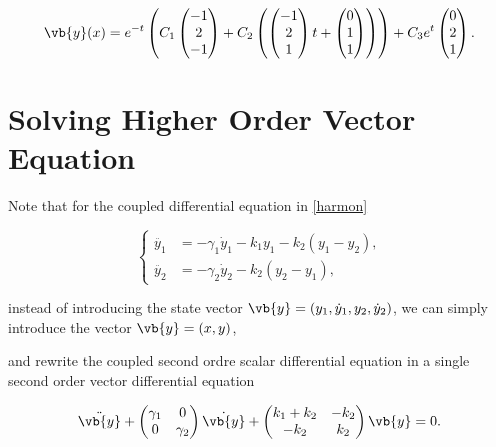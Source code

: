 \documentclass[english,a4paper,12pt]{report}
\begin{document}
{\begin{equation}
    \vb{y} (x) = e^{-t}\left( C_1 \begin{pmatrix}
         -1 \\
         2 \\
         -1 \\
    \end{pmatrix}  + C_2 \left( \begin{pmatrix}
         -1 \\
         2 \\
         1 \\
    \end{pmatrix}t + \begin{pmatrix}
         0 \\
         1 \\
         1 \\
    \end{pmatrix} \right) \right) + C_3 e^{t} \begin{pmatrix}
         0 \\
         2 \\
         1 \\
    \end{pmatrix}.  
\end{equation}
} 

\section{Solving Higher Order Vector Equation}

Note that for the coupled differential equation in \cref{harmon} 

\begin{equation}
    \begin{cases}
        \ddot{y_1 } &= -\gamma _{1}  \dot{y}_{1}  - k_1 y_1 - k_2 (y_1 -y_2 ), \\
        \ddot{y_2 } &= -\gamma _{2} \dot{y}_{2}  - k_2 (y_2 -y_1 ),
    \end{cases}    
\end{equation}

instead of introducing the state vector \(\vb{y} = (y_1 , \dot{y} _{1}, y_2 , \dot{y}_{2}    )\), we can simply introduce the vector \(\vb{y} = (x,y)\), 

and rewrite the coupled second ordre scalar differential equation in a single second order vector differential equation 

\begin{equation}
    \ddot{\vb{y} }  + \begin{pmatrix}
        \gamma _{1}  & 0  \\
        0 & \gamma _{2}   \\
    \end{pmatrix}\dot{\vb{y} } + \begin{pmatrix}
        k_1 +k_2  &  -k_2  \\
        -k_2  &  k_2  \\
    \end{pmatrix} \vb{y} = 0.
\end{equation}
\end{document}
